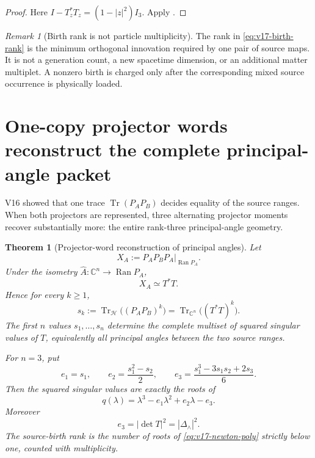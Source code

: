 \documentclass[11pt]{article}
\newtheorem{theorem}{Theorem}[section]
\theoremstyle{definition}
\theoremstyle{remark}
\newtheorem{remark}[remark]{Remark}
\newcommand{\Tr}{\operatorname{Tr}}
\begin{document}
\begin{proof}
Here
$I-T_z^*T_z=(1-|z|^2)I_3$.
Apply .
\end{proof}

\begin{remark}[Birth rank is not particle multiplicity]
The rank in \eqref{eq:v17-birth-rank} is the minimum orthogonal innovation
required by one pair of source maps.  It is not a generation count, a new
spacetime dimension, or an additional matter multiplet.  A nonzero birth is
charged only after the corresponding mixed source occurrence is physically
loaded.
\end{remark}

\section{One-copy projector words reconstruct the complete principal-angle packet}
\label{sec:v17-projector-moments}

V16 showed that one trace $\Tr(P_AP_B)$ decides equality of the source ranges.
When both projectors are represented, three alternating projector moments
recover substantially more: the entire rank-three principal-angle geometry.

\begin{theorem}[Projector-word reconstruction of principal angles]
\label{thm:v17-projector-moments}
Let
\[
 X_A:=P_AP_BP_A\big|_{\operatorname{Ran} P_A}.
\]
Under the isometry $\widehat A:\mathbb C^n\to\operatorname{Ran} P_A$,
\[
 \boxed{X_A\simeq T^*T.}
 \tag{V17.5}\label{eq:v17-compression}
\]
Hence for every $k\ge1$,
\[
 \boxed{
 s_k:=\Tr_{\mathcal H}\bigl((P_AP_B)^k\bigr)
 =\Tr_{\mathbb C^n}\bigl((T^*T)^k\bigr).}
 \tag{V17.6}\label{eq:v17-sk}
\]
The first $n$ values $s_1,\ldots,s_n$ determine the complete multiset of
squared singular values of $T$, equivalently all principal angles between the
two source ranges.

For $n=3$, put
\[
 e_1=s_1,
 \qquad
 e_2=\frac{s_1^2-s_2}{2},
 \qquad
 e_3=\frac{s_1^3-3s_1s_2+2s_3}{6}.
\]
Then the squared singular values are exactly the roots of
\[
 \boxed{
 q(\lambda)
 =\lambda^3-e_1\lambda^2+e_2\lambda-e_3.}
 \tag{V17.7}\label{eq:v17-newton-poly}
\]
Moreover
\[
 \boxed{e_3=|\det T|^2=|\Delta_\wedge|^2.}
 \tag{V17.8}\label{eq:v17-e3}
\]
The source-birth rank is the number of roots of \eqref{eq:v17-newton-poly}
strictly below one, counted with multiplicity.
\end{theorem}
\end{document}
